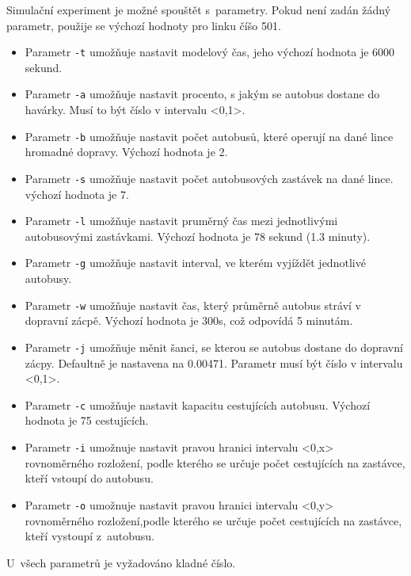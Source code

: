\documentclass[a4paper]{article}
\begin{document}
            Simulační experiment je možné spouštět s~parametry. Pokud není zadán žádný parametr, použije se výchozí hodnoty pro linku číšo 501.
            
            \begin{itemize}
                \item Parametr \texttt{-t} umožňuje nastavit modelový čas, jeho výchozí hodnota je 6000 sekund.
                \item Parametr \texttt{-a} umožňuje nastavit procento, s jakým se autobus dostane do havárky. Musí to být číslo v intervalu <0,1>.
                \item Parametr \texttt{-b} umožňuje nastavit počet autobusů, které operují na dané lince hromadné dopravy. Výchozí hodnota je 2.
                \item Parametr \texttt{-s} umožňuje nastavit počet autobusových zastávek na dané lince. výchozí hodnota je 7.
                \item Parametr \texttt{-l} umožňuje nastavit pruměrný čas mezi jednotlivými autobusovými zastávkami. Výchozí hodnota je 78 sekund (1.3 minuty).
                \item Parametr \texttt{-g} umožňuje nastavit interval, ve kterém vyjíždět jednotlivé autobusy.
                \item Parametr \texttt{-w} umožňuje nastavit čas, který průměrně autobus stráví v dopravní zácpě. Výchozí hodnota je 300s, což odpovídá 5 minutám.
                \item Parametr \texttt{-j} umožňuje měnit šanci, se kterou se autobus dostane do dopravní zácpy. Defaultně je nastavena na 0.00471. Parametr musí být číslo v intervalu <0,1>.
                \item Parametr \texttt{-c} umožňuje nastavit kapacitu cestujících autobusu. Výchozí hodnota je 75 cestujících.
            
            \item Parametr \texttt{-i} umožnuje nastavit pravou hranici intervalu <0,x> rovnoměrného rozložení, podle kterého se určuje počet cestujících na zastávce, kteří vstoupí do autobusu.
            \item Parametr \texttt{-o} umožnuje nastavit pravou hranici intervalu <0,y> rovnoměrného rozložení,podle kterého se určuje počet cestujících na zastávce, kteří vystoupí z~autobusu.
            \end{itemize}

            U~všech parametrů je vyžadováno kladné číslo.
\end{document}
